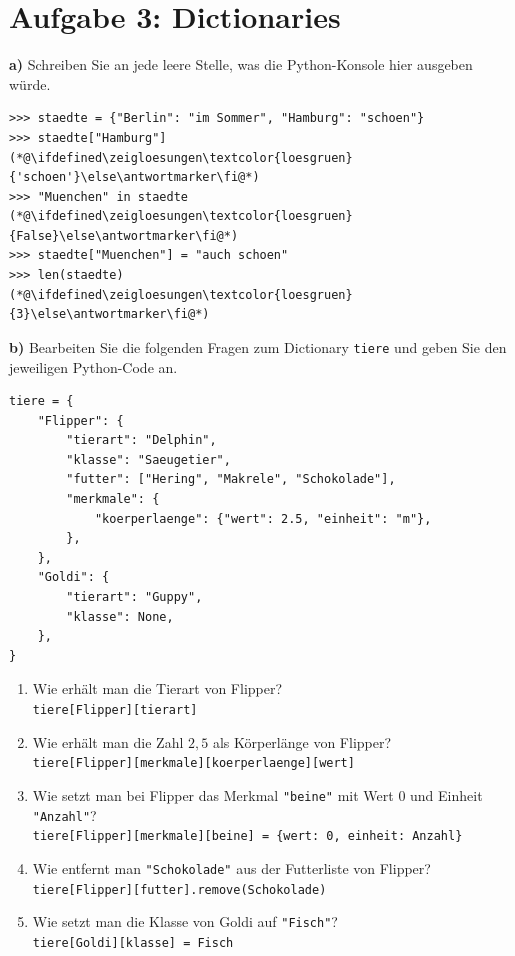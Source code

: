 \section*{Aufgabe 3: Dictionaries}

\noindent \textbf{a)} Schreiben Sie an jede leere Stelle, was die Python-Konsole hier ausgeben würde.

\begin{lstlisting}[style=python]
>>> staedte = {"Berlin": "im Sommer", "Hamburg": "schoen"}
>>> staedte["Hamburg"]
(*@\ifdefined\zeigloesungen\textcolor{loesgruen}{'schoen'}\else\antwortmarker\fi@*)
>>> "Muenchen" in staedte
(*@\ifdefined\zeigloesungen\textcolor{loesgruen}{False}\else\antwortmarker\fi@*)
>>> staedte["Muenchen"] = "auch schoen"
>>> len(staedte)
(*@\ifdefined\zeigloesungen\textcolor{loesgruen}{3}\else\antwortmarker\fi@*)
\end{lstlisting}

\medskip
\noindent \textbf{b)} Bearbeiten Sie die folgenden Fragen zum Dictionary \texttt{tiere} und geben Sie den jeweiligen Python-Code an.

\begin{lstlisting}[style=python]
tiere = {
    "Flipper": {
        "tierart": "Delphin",
        "klasse": "Saeugetier",
        "futter": ["Hering", "Makrele", "Schokolade"],
        "merkmale": {
            "koerperlaenge": {"wert": 2.5, "einheit": "m"},
        },
    },
    "Goldi": {
        "tierart": "Guppy",
        "klasse": None,
    },
}
\end{lstlisting}

\begin{enumerate}[label=\alph*)]
\item Wie erhält man die Tierart von Flipper?\\
\ifdefined\zeigloesungen\texttt{\textcolor{loesgruen}{tiere[\dq Flipper\dq][\dq tierart\dq]}}\fi

\item Wie erhält man die Zahl $2{,}5$ als Körperlänge von Flipper?\\
\ifdefined\zeigloesungen\texttt{\textcolor{loesgruen}{tiere[\dq Flipper\dq][\dq merkmale\dq][\dq koerperlaenge\dq][\dq wert\dq]}}\fi

\item Wie setzt man bei Flipper das Merkmal \lstinline|"beine"| mit Wert 0 und Einheit \lstinline|"Anzahl"|?\\
\ifdefined\zeigloesungen\texttt{\textcolor{loesgruen}{tiere[\dq Flipper\dq][\dq merkmale\dq][\dq beine\dq] = \{\dq wert\dq: 0, \dq einheit\dq: \dq Anzahl\dq\}}}\fi

\item Wie entfernt man \lstinline|"Schokolade"| aus der Futterliste von Flipper?\\
\ifdefined\zeigloesungen\texttt{\textcolor{loesgruen}{tiere[\dq Flipper\dq][\dq futter\dq].remove(\dq Schokolade\dq)}}\fi

\item Wie setzt man die Klasse von Goldi auf \lstinline|"Fisch"|?\\
\ifdefined\zeigloesungen\texttt{\textcolor{loesgruen}{tiere[\dq Goldi\dq][\dq klasse\dq] = \dq Fisch\dq}}\fi
\end{enumerate}

